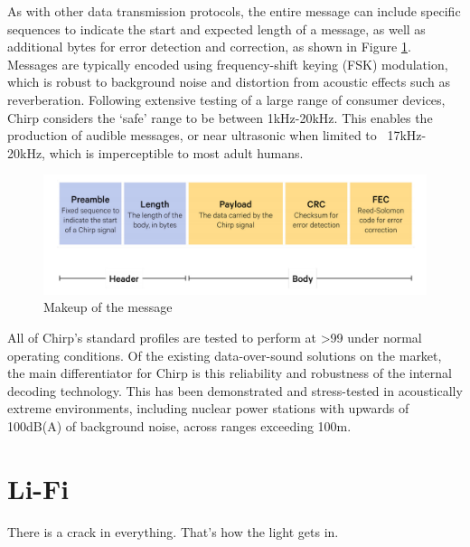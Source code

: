 \documentclass{article}
\begin{document}
As with other data transmission protocols, the entire message can include
specific sequences to indicate the start and expected length of a message, as
well as additional bytes for error detection and correction, as shown in Figure
\ref{fig:dos_message}. Messages are typically encoded using frequency-shift
keying (FSK) modulation, which is robust to background noise and distortion
from acoustic effects such as reverberation. Following extensive testing of a
large range of consumer devices, Chirp considers the ‘safe’ range to be between
1kHz-20kHz. This enables the production of audible messages, or near ultrasonic
when limited to ~17kHz-20kHz, which is imperceptible to most adult humans. 

\begin{figure}[!h]
  \includegraphics[width=\linewidth]{res/dos_message.png}
    \caption{Makeup of the message}
  \label{fig:dos_message}
\end{figure}

All of Chirp’s standard profiles are tested to perform at >99%
under normal operating conditions. Of the existing data-over-sound solutions
on the market, the main differentiator for Chirp is this reliability and
robustness of the internal decoding technology. This has been demonstrated and
stress-tested in acoustically extreme environments, including nuclear power
stations with upwards of 100dB(A) of background noise, across ranges exceeding
100m.

\nocite{chirp17}
\printbibliography[heading=subbibliography]




\newpage
\section{Li-Fi}

\epigraph{There is a crack in everything.
That's how the light gets in.}{\parencite{selected-poem}}


\end{document}
